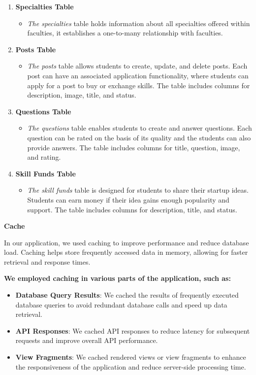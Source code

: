 \begin{enumerate}
\item \textbf{Specialties Table}
\begin{itemize}
\item \textit{The specialties} table holds information about all specialties offered within faculties, it establishes a one-to-many relationship with faculties.
\end{itemize}

\item \textbf{Posts Table}
\begin{itemize}
\item \textit{The posts} table allows students to create, update, and delete posts. Each post can have an associated application functionality, where students can apply for a post to buy or exchange skills. The table includes columns for description, image, title, and status.
\end{itemize}

\item \textbf{Questions Table}

\begin{itemize}
\item \textit{The questions} table enables students to create and answer questions. Each question can be rated on the basis of its quality and the students can also provide answers. The table includes columns for title, question, image, and rating.
\end{itemize}

\item \textbf{Skill Funds Table}

\begin{itemize}
\item \textit{The skill funds} table is designed for students to share their startup ideas. Students can earn money if their idea gains enough popularity and support. The table includes columns for description, title, and status.
\end{itemize}
\end{enumerate}
\textbf{Cache}

In our application, we used caching to improve performance and reduce database \cite{dbms} load. Caching helps store frequently accessed data in memory, allowing for faster retrieval and response times.
\vspace{0.5cm}
\par
\textbf{We employed caching in various parts of the application, such as:}

\begin{itemize}
    \item \textbf{Database Query Results}: We cached the results of frequently executed database queries to avoid redundant database calls and speed up data retrieval.
    
    \item \textbf{API Responses}: We cached API responses to reduce latency for subsequent requests and improve overall API performance.
    
    \item \textbf{View Fragments}: We cached rendered views or view fragments to enhance the responsiveness of the application and reduce server-side processing time.
\end{itemize}

